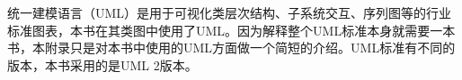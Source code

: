 统一建模语言（UML）是用于可视化类层次结构、子系统交互、序列图等的行业标准图表，本书在其类图中使用了UML。因为解释整个UML标准本身就需要一本书，本附录只是对本书中使用的UML方面做一个简短的介绍。UML标准有不同的版本，本书采用的是UML 2版本。